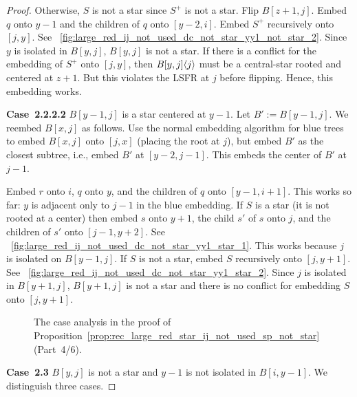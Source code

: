 \documentclass[11pt,a4paper,colorlinks=true,urlcolor=blue,citecolor=red]{article}
\theoremstyle{plain}
\newcommand{\case}[1]{\par\vspace{.5\baselineskip}\noindent\textbf{\sffamily Case~#1}}
\begin{document}
\begin{proof}
  Otherwise, $S$ is not a star since $S^+$ is not a star. Flip
  $B[z+1,j]$. Embed $q$ onto $y-1$ and the children of $q$ onto
  $[y-2,i]$. Embed $S^+$ recursively onto $[j,y]$. See
  \figurename~\ref{fig:large_red_ij_not_used_dc_not_star_yy1_not_star_2}.
  Since $y$ is isolated in $B[y,j]$, $B[y,j]$ is not a star. If there is
  a conflict for the embedding of $S^+$ onto $[j,y]$, then
  $B{[y,j]}\langle{j}\rangle$ must be a central-star rooted and centered at
  $z+1$. But this violates the LSFR at $j$ before flipping. Hence, this
  embedding works.



  \case{2.2.2.2} $B[y-1,j]$ is a star centered at $y-1$. Let
  $B':=B[y-1,j]$. We reembed $B[x,j]$ as follows. Use the normal
  embedding algorithm for blue trees to embed $B[x,j]$ onto $[j,x]$
  (placing the root at $j$), but embed $B'$ as the closest subtree,
  i.e., embed $B'$ at $[y-2,j-1]$. This embeds the center of $B'$ at
  $j-1$.

  Embed $r$ onto $i$, $q$ onto $y$, and the children of $q$ onto
  $[y-1,i+1]$. This works so far: $y$ is adjacent only to $j-1$ in the
  blue embedding. If $S$ is a star (it is not rooted at a center) then
  embed $s$ onto $y+1$, the child $s'$ of $s$ onto $j$, and the children
  of $s'$ onto $[j-1,y+2]$. See
  \figurename~\ref{fig:large_red_ij_not_used_dc_not_star_yy1_star_1}.
  This works because $j$ is isolated on $B[y-1,j]$. If $S$ is not a
  star, embed $S$ recursively onto $[j,y+1]$. See
  \figurename~\ref{fig:large_red_ij_not_used_dc_not_star_yy1_star_2}.
  Since $j$ is isolated in $B[y+1,j]$, $B[y+1,j]$ is not a star and
  there is no conflict for embedding $S$ onto $[j,y+1]$.


  \begin{figure}
    \centering\hfil {}\hfil {}\hfil {}\hfil \caption{The case analysis in the proof of
      Proposition~\ref{prop:rec_large_red_star_ij_not_used_sp_not_star}~(Part~4/6).}
  \end{figure}


  \case{2.3} $B[y,j]$ is not a star and $y-1$ is not isolated in
  $B[i,y-1]$. We distinguish three cases.


\end{proof}
\end{document}
